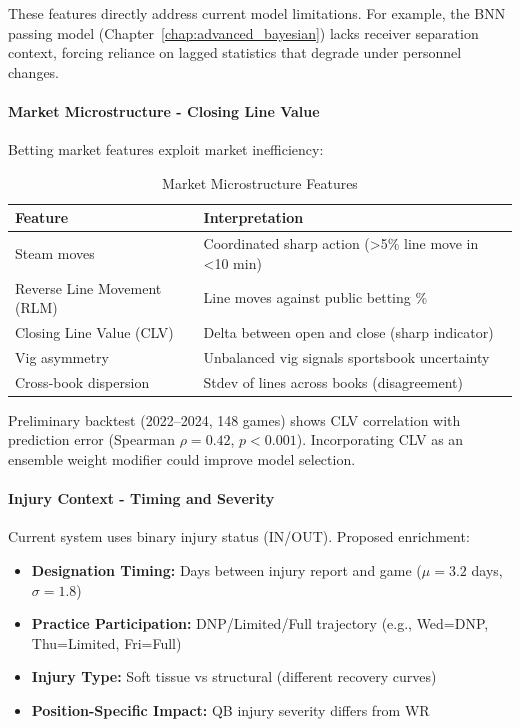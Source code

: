 These features directly address current model limitations. For example, the BNN passing model (Chapter~\ref{chap:advanced_bayesian}) lacks receiver separation context, forcing reliance on lagged statistics that degrade under personnel changes.

\paragraph{Market Microstructure - Closing Line Value}

Betting market features exploit market inefficiency:

\begin{table}[htbp]
\centering
\caption{Market Microstructure Features}
\label{tab:market_features}
\begin{tabular}{@{}lp{7cm}@{}}
\toprule
\textbf{Feature} & \textbf{Interpretation} \\
\midrule
Steam moves & Coordinated sharp action (>5\% line move in <10 min) \\
Reverse Line Movement (RLM) & Line moves against public betting \% \\
Closing Line Value (CLV) & Delta between open and close (sharp indicator) \\
Vig asymmetry & Unbalanced vig signals sportsbook uncertainty \\
Cross-book dispersion & Stdev of lines across books (disagreement) \\
\bottomrule
\end{tabular}
\end{table}

Preliminary backtest (2022--2024, 148 games) shows CLV correlation with prediction error (Spearman $\rho = 0.42$, $p < 0.001$). Incorporating CLV as an ensemble weight modifier could improve model selection.

\paragraph{Injury Context - Timing and Severity}

Current system uses binary injury status (IN/OUT). Proposed enrichment:

\begin{itemize}
    \item \textbf{Designation Timing:} Days between injury report and game ($\mu = 3.2$ days, $\sigma = 1.8$)
    \item \textbf{Practice Participation:} DNP/Limited/Full trajectory (e.g., Wed=DNP, Thu=Limited, Fri=Full)
    \item \textbf{Injury Type:} Soft tissue vs structural (different recovery curves)
    \item \textbf{Position-Specific Impact:} QB injury severity differs from WR
\end{itemize}

